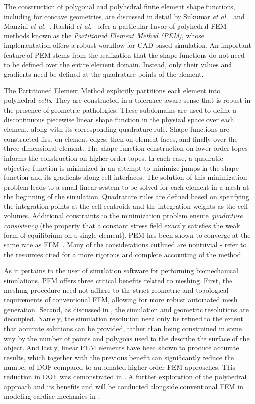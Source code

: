 The construction of polygonal and polyhedral finite element shape functions, including for concave geometries, are discussed in detail by Sukumar \textit{et al.}~\cite{sukumar_2006} and Manzini \textit{et al.}~\cite{manzini_2014}. Rashid \textit{et al.}~\cite{rashid_2012, rashid_2015} offer a particular flavor of polyhedral FEM methods known as the \textit{Partitioned Element Method (PEM)}, whose implementation offers a robust workflow for CAD-based simulation. An important feature of PEM stems from the realization that the shape functions do not need to be defined over the entire element domain. Instead, only their values and gradients need be defined at the quadrature points of the element.

The Partitioned Element Method explicitly partitions each element into polyhedral \textit{cells}. They are constructed in a tolerance-aware sense that is robust in the presence of geometric pathologies. These subdomains are used to define a discontinuous piecewise linear shape function in the physical space over each element, along with its corresponding quadrature rule. Shape functions are constructed first on element edges, then on element faces, and finally over the three-dimensional element. The shape function construction on lower-order topes informs the construction on higher-order topes. In each case, a quadratic objective function is minimized in an attempt to minimize jumps in the shape function and its gradients along cell interfaces. The solution of this minimization problem leads to a small linear system to be solved for each element in a mesh at the beginning of the simulation. Quadrature rules are defined based on specifying the integration points at the cell centroids and the integration weights as the cell volumes. Additional constraints to the minimization problem ensure \textit{quadrature consistency} (the property that a constant stress field exactly satisfies the weak form of equilibrium on a single element). PEM has been shown to converge at the same rate as FEM~\cite{rashid_2012}. Many of the considerations outlined are nontrivial - refer to the resources cited for a more rigorous and complete accounting of the method.

As it pertains to the user of simulation software for performing biomechanical simulations, PEM offers three critical benefits related to meshing. First, the meshing procedure need not adhere to the strict geometric and topological requirements of conventional FEM, allowing for more robust automated mesh generation. Second, as discussed in , the simulation and geometric resolutions are decoupled. Namely, the simulation resolution need only be refined to the extent that accurate solutions can be provided, rather than being constrained in some way by the number of points and polygons used to the describe the surface of the object. And lastly, linear PEM elements have been shown to produce accurate results, which together with the previous benefit can significantly reduce the number of DOF compared to automated higher-order FEM approaches. This reduction in DOF was demonstrated in . A further exploration of the polyhedral approach and its benefits and will be conducted alongside conventional FEM in modeling cardiac mechanics in .

